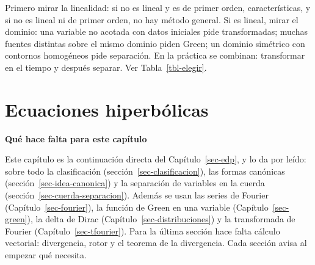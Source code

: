 \documentclass[
  spanish,
  a4paper,
]{scrbook}
\theoremstyle{definition}
\theoremstyle{plain}
\theoremstyle{definition}
\theoremstyle{plain}
\theoremstyle{definition}
\theoremstyle{remark}
\begin{document}
\begin{tcolorbox}[enhanced jigsaw, arc=.35mm, bottomrule=.15mm, bottomtitle=1mm, breakable, colback=white, colbacktitle=quarto-callout-tip-color!10!white, colframe=quarto-callout-tip-color-frame, coltitle=black, left=2mm, leftrule=.75mm, opacityback=0, opacitybacktitle=0.6, rightrule=.15mm, title=\textcolor{quarto-callout-tip-color}{\faLightbulb}\hspace{0.5em}{25. ¿Cuál de los cuatro métodos usarías, y por qué?}, titlerule=0mm, toprule=.15mm, toptitle=1mm]

Primero mirar la linealidad: si no es lineal y es de primer orden,
características, y si no es lineal ni de primer orden, no hay método
general. Si es lineal, mirar el dominio: una variable no acotada con
datos iniciales pide transformadas; muchas fuentes distintas sobre el
mismo dominio piden Green; un dominio simétrico con contornos homogéneos
pide separación. En la práctica se combinan: transformar en el tiempo y
después separar. Ver Tabla~\ref{tbl-elegir}.

\end{tcolorbox}

\chapter{Ecuaciones hiperbólicas}\label{sec-hiperbolicas}

\begin{tcolorbox}[enhanced jigsaw, arc=.35mm, bottomrule=.15mm, breakable, colback=white, colframe=quarto-callout-note-color-frame, left=2mm, leftrule=.75mm, opacityback=0, rightrule=.15mm, toprule=.15mm]
\begin{minipage}[t]{5.5mm}
\textcolor{quarto-callout-note-color}{\faInfo}
\end{minipage}%
\begin{minipage}[t]{\textwidth - 5.5mm}

\vspace{-3mm}\textbf{Qué hace falta para este capítulo}\vspace{3mm}

Este capítulo es la continuación directa del Capítulo~\ref{sec-edp}, y
lo da por leído: sobre todo la clasificación
(sección~\ref{sec-clasificacion}), las formas canónicas
(sección~\ref{sec-idea-canonica}) y la separación de variables en la
cuerda (sección~\ref{sec-cuerda-separacion}). Además se usan las series
de Fourier (Capítulo~\ref{sec-fourier}), la función de Green en una
variable (Capítulo~\ref{sec-green}), la delta de Dirac
(Capítulo~\ref{sec-distribuciones}) y la transformada de Fourier
(Capítulo~\ref{sec-tfourier}). Para la última sección hace falta cálculo
vectorial: divergencia, rotor y el teorema de la divergencia. Cada
sección avisa al empezar qué necesita.

\end{minipage}%
\end{tcolorbox}
\end{document}
